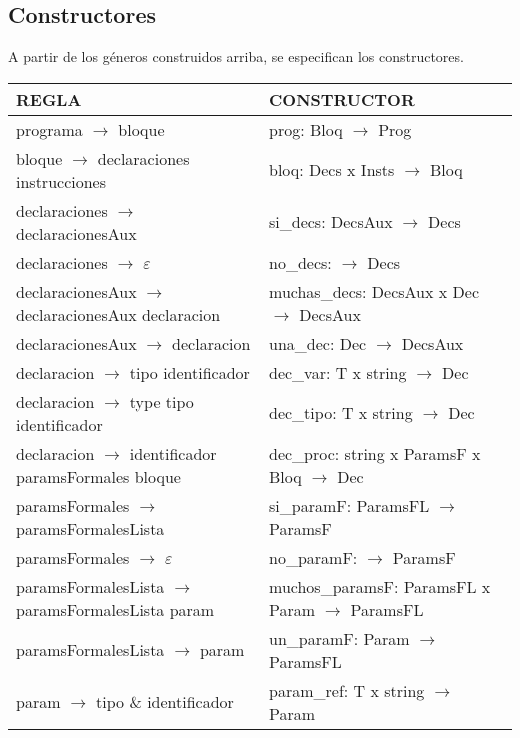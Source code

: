 \documentclass[11pt]{article}
\begin{document}
    \subsection{Constructores}
    A partir de los géneros construidos arriba, se especifican los constructores.
    \begin{center}
    \begin{longtable}{|p{7cm}|p{7cm}|} 
        \hline
        \textbf{REGLA} & \textbf{CONSTRUCTOR} \\
        \hline
        programa $\rightarrow$ bloque & prog: Bloq $\rightarrow$ Prog \\
        \hline
        bloque $\rightarrow$ declaraciones instrucciones & bloq: Decs x Insts $\rightarrow$ Bloq \\
        \hline
        declaraciones $\rightarrow$ declaracionesAux & si\_decs: DecsAux $\rightarrow$ Decs \\
        \hline
        declaraciones $\rightarrow$ $\varepsilon$ & no\_decs: $\rightarrow$ Decs \\
        \hline
        declaracionesAux $\rightarrow$ declaracionesAux declaracion & muchas\_decs: DecsAux x Dec $\rightarrow$ DecsAux \\
        \hline
        declaracionesAux $\rightarrow$ declaracion & una\_dec: Dec $\rightarrow$ DecsAux \\
        \hline
        declaracion $\rightarrow$ tipo identificador & dec\_var: T x string $\rightarrow$ Dec \\
        \hline
        declaracion $\rightarrow$ type tipo identificador & dec\_tipo: T x string $\rightarrow$ Dec \\
        \hline
        declaracion $\rightarrow$ identificador paramsFormales bloque & dec\_proc: string x ParamsF x Bloq $\rightarrow$ Dec \\
        \hline
        paramsFormales $\rightarrow$ paramsFormalesLista & si\_paramF: ParamsFL $\rightarrow$ ParamsF \\
        \hline
        paramsFormales $\rightarrow$ $\varepsilon$ & no\_paramF: $\rightarrow$ ParamsF \\
        \hline
        paramsFormalesLista $\rightarrow$ paramsFormalesLista param & muchos\_paramsF: ParamsFL x Param $\rightarrow$ ParamsFL \\
        \hline
        paramsFormalesLista $\rightarrow$ param & un\_paramF: Param $\rightarrow$ ParamsFL \\
        \hline
        param $\rightarrow$ tipo \& identificador & param\_ref: T x string $\rightarrow$ Param \\

\end{longtable}
\end{center}
\end{document}
